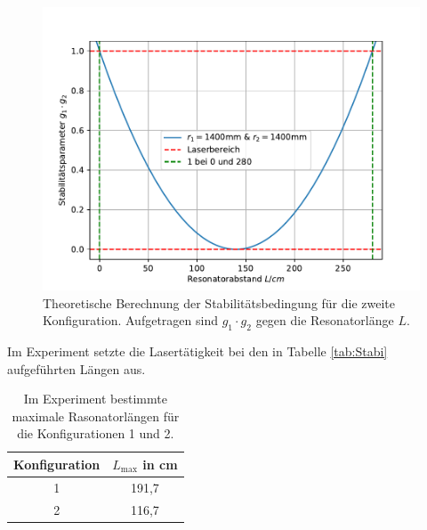 \begin{figure}[H]
  \centering
  \includegraphics{plots/Vorbereitungsplot1.pdf}
  \caption{Theoretische Berechnung der Stabilitätsbedingung für die zweite Konfiguration. Aufgetragen sind
   $g_1 \cdot g_2$ gegen die Resonatorlänge $L$.}
  \label{fig:Konfig2}
\end{figure}

Im Experiment setzte die Lasertätigkeit bei den in Tabelle \ref{tab:Stabi} aufgeführten
Längen aus.
\begin{table}[H]
    \centering
    \caption{Im Experiment bestimmte maximale Rasonatorlängen für die Konfigurationen 1 und 2.}
    \label{tab:Konfig}
    \begin{tabular}{c|c}
        \toprule
        Konfiguration & $L_{\text{max}}$ in cm  \\
        \midrule
        1 & 191,7\\
        2& 116,7 \\
        \bottomrule
    \end{tabular}
\end{table}

